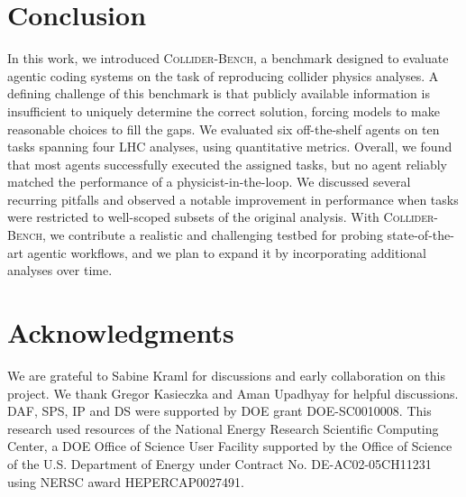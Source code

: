\documentclass{article}
\newcommand{\ColliderBench}{\textsc{Collider-Bench}}
\begin{document}
\section{Conclusion}
\label{sec:conclusion}
% 
In this work, we introduced \ColliderBench{}, a benchmark designed to evaluate agentic coding systems on the task of reproducing collider physics analyses. A defining challenge of this benchmark is that publicly available information is insufficient to uniquely determine the correct solution, forcing models to make reasonable choices to fill the gaps. We evaluated six off-the-shelf agents on ten tasks spanning four LHC analyses, using quantitative metrics. Overall, we found that most agents successfully executed the assigned tasks, but no agent reliably matched the performance of a physicist-in-the-loop. We discussed several recurring pitfalls and observed a notable improvement in performance when tasks were restricted to well-scoped subsets of the original analysis. With \ColliderBench{}, we contribute a realistic and challenging testbed for probing state-of-the-art agentic workflows, and we plan to expand it by incorporating additional analyses over time.

\section*{Acknowledgments}
We are grateful to Sabine Kraml for discussions and early collaboration on this project. We thank Gregor Kasieczka and Aman Upadhyay for helpful discussions.
DAF, SPS, IP and DS were supported by DOE grant DOE-SC0010008. This research used resources of the National Energy Research Scientific Computing Center, a DOE Office of Science User Facility supported by the Office of Science of the U.S. Department of Energy under Contract
No. DE-AC02-05CH11231 using NERSC award HEPERCAP0027491.




\clearpage
\appendix
\end{document}
